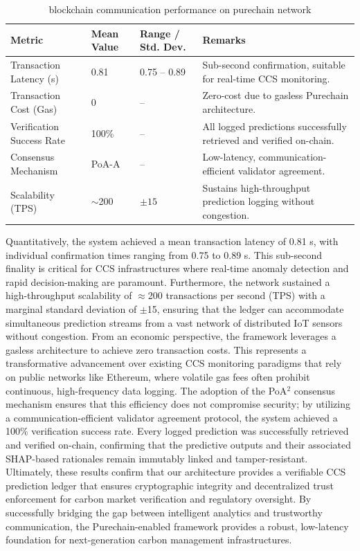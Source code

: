 \documentclass[conference]{IEEEtran}
\begin{document}
{\begin{table}[htbp]
\centering
\scriptsize
\caption{blockchain communication performance on purechain network}
\begin{tabular}{p{1.2cm} p{1.3cm} p{1.8cm} p{3cm}}
\hline \toprule
\textbf{Metric} & \textbf{Mean Value} & \textbf{Range / Std. Dev.} & \textbf{Remarks} \\
\hline \toprule
Transaction Latency (s) & 0.81 & 0.75 -- 0.89 & Sub-second confirmation, suitable for real-time CCS monitoring. \\
\hline
Transaction Cost (Gas)  & 0   & --            & Zero-cost due to gasless Purechain architecture. \\
\hline
Verification Success Rate & 100\% & --         & All logged predictions successfully retrieved and verified on-chain. \\
\hline
Consensus Mechanism & PoA-A & --             & Low-latency, communication-efficient validator agreement. \\
\hline
Scalability (TPS) & $\sim$200 & $\pm 15$     & Sustains high-throughput prediction logging without congestion. \\
\hline \toprule
\end{tabular}
\label{tab:blockchain_performance}
\end{table}

Quantitatively, the system achieved a mean transaction latency of 0.81 s, with individual confirmation times ranging from 0.75 to 0.89 s. This sub-second finality is critical for CCS infrastructures where real-time anomaly detection and rapid decision-making are paramount. Furthermore, the network sustained a high-throughput scalability of $\approx$200 transactions per second (TPS) with a marginal standard deviation of $\pm$15, ensuring that the ledger can accommodate simultaneous prediction streams from a vast network of distributed IoT sensors without congestion. From an economic perspective, the framework leverages a gasless architecture to achieve zero transaction costs. This represents a transformative advancement over existing CCS monitoring paradigms that rely on public networks like Ethereum, where volatile gas fees often prohibit continuous, high-frequency data logging. The adoption of the PoA$^{2}$ consensus mechanism ensures that this efficiency does not compromise security; by utilizing a communication-efficient validator agreement protocol, the system achieved a 100\% verification success rate. Every logged prediction was successfully retrieved and verified on-chain, confirming that the predictive outputs and their associated SHAP-based rationales remain immutably linked and tamper-resistant. Ultimately, these results confirm that our architecture provides a verifiable CCS prediction ledger that ensures cryptographic integrity and decentralized trust enforcement for carbon market verification and regulatory oversight. By successfully bridging the gap between intelligent analytics and trustworthy communication, the Purechain-enabled framework provides a robust, low-latency foundation for next-generation carbon management infrastructures.


}
\end{document}
